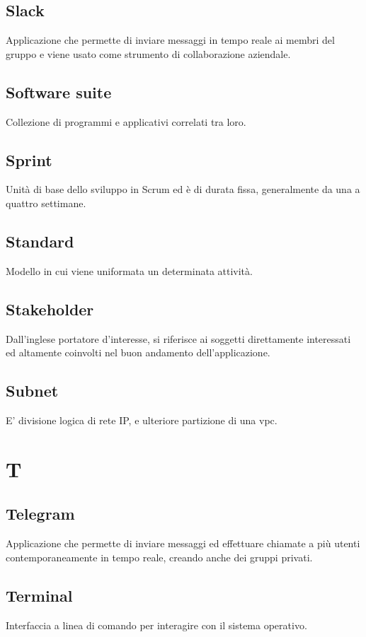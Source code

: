 \documentclass{classes/base}
\begin{document}
        \subsection*{Slack} 
        Applicazione che permette di inviare messaggi in tempo reale ai membri del gruppo e viene usato come strumento di collaborazione aziendale.

        \subsection*{Software suite} 
        Collezione di programmi e applicativi correlati tra loro.
        
        \subsection*{Sprint}
        Unità di base dello sviluppo in Scrum ed è di durata fissa, generalmente da una a quattro settimane.

        \subsection*{Standard}
        Modello in cui viene uniformata un determinata attività.

        \subsection*{Stakeholder} 
        Dall'inglese portatore d'interesse, si riferisce ai soggetti direttamente interessati ed altamente coinvolti nel buon andamento dell'applicazione.

        \subsection*{Subnet}
        E' divisione logica di rete IP, e ulteriore partizione di una vpc.
        \newpage  
    \section{T}
        \subsection*{Telegram}
        Applicazione che permette di inviare messaggi ed effettuare chiamate a più utenti contemporaneamente in tempo reale, creando anche dei gruppi privati.

        \subsection*{Terminal} 
        Interfaccia a linea di comando per interagire con il sistema operativo.
        
\end{document}
